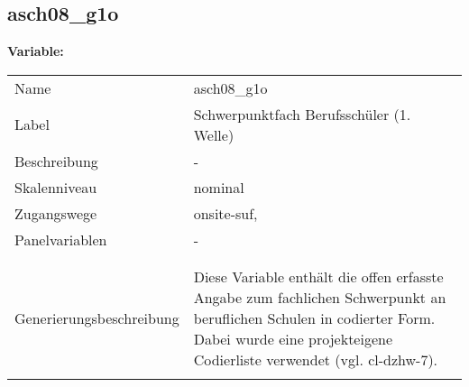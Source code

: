 	
	
	\subsection{asch08\_g1o}
	\label{subSection:asch08_g1o}

	\noindent\textbf{Variable:}\\
		\begin{tabular}{lL{11.3cm}}
			\label{tableVariable:asch08_g1o}
			Name & asch08\_g1o \\
			Label & Schwerpunktfach Berufsschüler (1. Welle) \\
			Beschreibung & - \\
			Skalenniveau & nominal \\
			Zugangswege &
				onsite-suf,
 \\
			Panelvariablen & -
			 \\
			 \\
 \\
					Generierungsbeschreibung & Diese Variable enthält die offen erfasste Angabe zum fachlichen Schwerpunkt an beruflichen Schulen in codierter Form. Dabei wurde eine projekteigene Codierliste verwendet (vgl. cl-dzhw-7).
				 \\	
			 \\
		\end{tabular}






